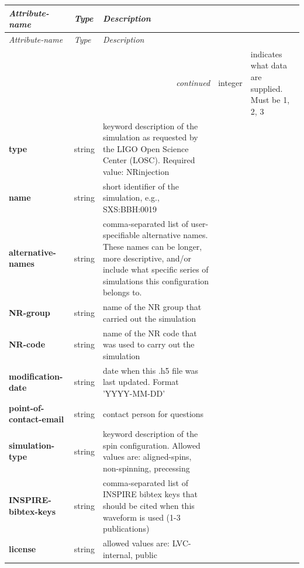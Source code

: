\documentclass[11pt,tightenlines,article,amssymb,amsmath,amsfonts,superscriptaddress,nofootinbib]{revtex4}
\begin{document}
\noindent

\renewcommand*{\arraystretch}{1.5} %
\begin{longtable}{|p{3.4cm}|p{1.6cm}|p{11.2cm}|}
  \hline  \emph{Attribute-name} & \emph{Type} & \emph{Description} \\ \hline
  \endhead
  \hline  \emph{Attribute-name} & \emph{Type} & \emph{Description} \\ \hline
\endfirsthead
\hline 
 \multicolumn{3}{r}{\emph{continued}}
\endfoot
\hline
\endlastfoot
  \textbf{Format} & integer & indicates what data are supplied. Must be 1, 2, 3\\
  \textbf{type} & string & keyword description of the simulation as requested by the LIGO Open Science Center (LOSC). Required value: NRinjection\\
  \textbf{name} & string  & short identifier of the simulation, e.g., SXS:BBH:0019\\


\textbf{alternative-names} & string & comma-separated list of user-specifiable alternative names. These names can be longer, more descriptive, and/or include what specific series of simulations this configuration belongs to.\\

\textbf{NR-group} & string &  name of the NR group that carried out the simulation\\

\textbf{NR-code} & string &  name of the NR code that was used to carry out the simulation\\

\textbf{modification-date} & string & date when this .h5 file was last updated. Format 'YYYY-MM-DD'\\

\textbf{point-of-contact-email} & string & contact person for questions\\

\textbf{simulation-type} & string & keyword description of the spin configuration. Allowed values are: aligned-spins, non-spinning, precessing\\

\textbf{INSPIRE-bibtex-keys} & string & comma-separated list of INSPIRE bibtex keys that should be cited when this waveform is used (1-3 publications)\\

\textbf{license} & string & allowed values are: LVC-internal, public\\


\end{longtable}
\end{document}
